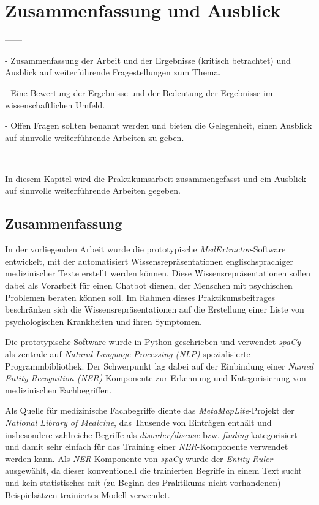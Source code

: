 \chapter{Zusammenfassung und Ausblick}
\label{ch:zusammenfassung}


------

- Zusammenfassung der Arbeit und der Ergebnisse (kritisch betrachtet) und Ausblick auf weiterführende Fragestellungen zum Thema.


- Eine Bewertung der Ergebnisse und der Bedeutung der Ergebnisse im wissenschaftlichen Umfeld.


- Offen Fragen sollten benannt werden und bieten die Gelegenheit, einen Ausblick auf sinnvolle weiterführende Arbeiten zu geben.

-----

In diesem Kapitel wird die Praktikumsarbeit zusammengefasst und ein Ausblick auf sinnvolle weiterführende Arbeiten gegeben.




\section{Zusammenfassung}
\label{sec:Zusammenfassung} 

In der vorliegenden Arbeit wurde die prototypische \emph{MedExtractor}-Software entwickelt, mit der automatisiert Wissensrepräsentationen englischsprachiger medizinischer Texte erstellt werden können. Diese Wissensrepräsentationen sollen dabei als Vorarbeit für einen Chatbot dienen, der Menschen mit psychischen Problemen beraten können soll. Im Rahmen dieses Praktikumsbeitrages beschränken sich die Wissensrepräsentationen auf die Erstellung einer Liste von psychologischen Krankheiten und ihren Symptomen. 

Die prototypische Software wurde in Python geschrieben und verwendet \emph{spaCy} als zentrale auf \emph{Natural Language Processing (NLP)} spezialisierte Programmbibliothek. Der Schwerpunkt lag dabei auf der Einbindung einer \emph{Named Entity Recognition (NER)}-Komponente zur Erkennung und Kategorisierung von medizinischen Fachbegriffen.

Als Quelle für medizinische Fachbegriffe diente das \emph{MetaMapLite}-Projekt der \emph{National Library of Medicine}, das Tausende von Einträgen enthält und insbesondere zahlreiche Begriffe als \emph{disorder/disease} bzw. \emph{finding} kategorisiert und damit sehr einfach für das Training einer \emph{NER}-Komponente verwendet werden kann. Als \emph{NER}-Komponente von \emph{spaCy} wurde der \emph{Entity Ruler} ausgewählt, da dieser konventionell die trainierten Begriffe in einem Text sucht und kein statistisches mit (zu Beginn des Praktikums nicht vorhandenen) Beispielsätzen trainiertes Modell verwendet.

